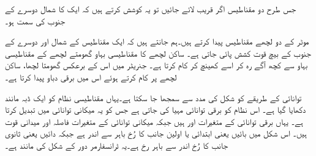  جس طرح دو مقناطیس اگر قریب لائے جائیں تو یہ کوشش کرتے ہیں کہ ایک کا شمال  دوسرے کے جنوب  کی سمت  ہو۔

 موٹر کے دو  لچھے مقناطیس پیدا کرتے ہیں۔ہم جانتے ہیں کہ  ایک مقناطیس  کے شمال  اور دوسرے کے جنوب  کے بیچ قوت کشش پائی جاتی ہے۔ ساکن لچھے کا مقناطیسی بہاو  گھومتے لچھے کے مقناطیسی بہاو سے کچھ آگے رہ کر اسے کھینچ  کر  کام کرتا ہے۔ جنریٹر میں اس کے برعکس  گھومتا لچھا، ساکن لچھے پر کام کرتے ہوئے اس میں برقی دباو پیدا کرتا ہے۔

توانائی کے طریقے کو شکل   کی مدد سے سمجھا جا سکتا ہے۔یہاں مقناطیسی نظام کو ایک ڈبہ  مانند دکھایا گیا ہے۔ اس نظام کو برقی توانائی مہیا کی جاتی ہے جس کو یہ میکانی توانائی میں تبدیل کرتا ہے۔ یہاں برقی توانائی کے متغیرات   اور  ہیں جبکہ میکانی توانائی کے متغیرات فاصلہ  اور میدانی قوت  ہیں۔ اس شکل میں بائیں یعنی ابتدائی یا اولین جانب  کا رُخ باہر سے اندر ہے جبکہ  دائیں یعنی ثانوی جانب   کا رُخ اندر سے  باہر رخ ہے۔یہ  ٹرانسفارمر دور کے شکل   کی مانند ہے۔

